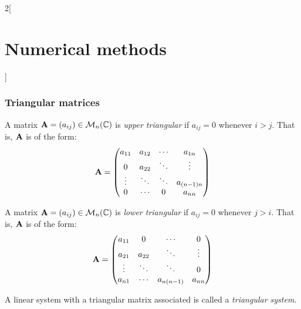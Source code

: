 \documentclass[../../../main.tex]{subfiles}
\begin{document}
\begin{multicols}{2}[\section{Numerical methods}]
    \subsubsection*{Triangular matrices}
    \begin{definition}
        A matrix $\boldsymbol{\mathrm{A}}=(a_{ij})\in\mathcal{M}_n(\mathbb{C})$ is \textit{upper triangular} if $a_{ij}=0$ whenever $i>j$. That is, $\boldsymbol{\mathrm{A}}$ is of the form:
        $$\boldsymbol{\mathrm{A}}=
            \begin{pmatrix}
                a_{11} & a_{12} & \cdots & a_{1n}     \\
                0      & a_{22} & \ddots & \vdots     \\
                \vdots & \ddots & \ddots & a_{(n-1)n} \\
                0      & \cdots & 0      & a_{nn}
            \end{pmatrix}
        $$
    \end{definition}
    \begin{definition}
        A matrix $\boldsymbol{\mathrm{A}}=(a_{ij})\in\mathcal{M}_n(\mathbb{C})$ is \textit{lower triangular} if $a_{ij}=0$ whenever $j>i$. That is, $\boldsymbol{\mathrm{A}}$ is of the form:
        $$\boldsymbol{\mathrm{A}}=
            \begin{pmatrix}
                a_{11} & 0      & \cdots     & 0      \\
                a_{21} & a_{22} & \ddots     & \vdots \\
                \vdots & \ddots & \ddots     & 0      \\
                a_{n1} & \cdots & a_{n(n-1)} & a_{nn}
            \end{pmatrix}
        $$
    \end{definition}
    \begin{definition}
        A linear system with a triangular matrix associated is called a \textit{triangular system}.
    \end{definition}

\end{multicols}
\end{document}
